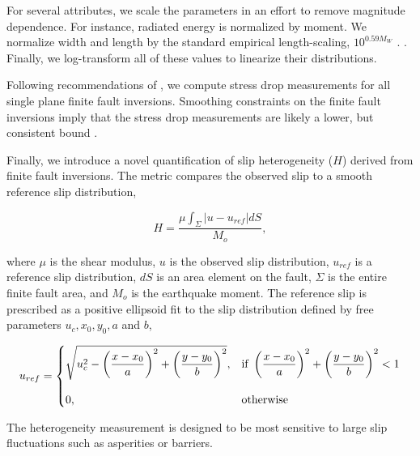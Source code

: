 \documentclass[draft, jgrga]{agujournal2018}
\begin{document}
For several attributes, we scale the parameters in an effort to remove magnitude dependence. For instance, radiated energy is normalized by moment. We normalize width and length by the standard empirical length-scaling, $10^{0.59M_W}$ \citep[][Table 2A - Subsurface rupture dimensions]{Wells1994}.  \citep[][Table 2A - Rupture area]{Wells1994}. Finally, we log-transform all of these values to linearize their distributions. 

Following recommendations of \citet{Noda2013}, we compute stress drop measurements for all single plane finite fault inversions. Smoothing constraints on the finite fault inversions imply that the stress drop measurements are likely a lower, but consistent bound \citep{Adams2017ExploringInversions}. 

Finally, we introduce a novel quantification of slip heterogeneity ($H$) derived from finite fault inversions. The metric compares the observed slip to a smooth reference slip distribution,
%
\begin{linenomath*}
\begin{equation}
    H = \dfrac{\mu \int_\Sigma |u-u_{ref}| dS}{M_o},
\end{equation}
\end{linenomath*}
%
where $\mu$ is the shear modulus, $u$ is the observed slip distribution, $u_{ref}$ is a reference slip distribution, $dS$ is an area element on the fault, $\Sigma$ is the entire finite fault area, and $M_o$ is the earthquake moment. The reference slip is prescribed as a positive ellipsoid fit to the slip distribution defined by free parameters $u_{c}, x_0, y_0, a$ and $b$,
%
\begin{linenomath*}
\begin{equation}\label{eq:heterogeneity}
u_{ref}=\left\{
\begin{array}{@{}ll@{}}
     \sqrt{u_{c}^2 - \left(\dfrac{x-x_0}{a}\right)^2 +  \left(\dfrac{y-y_0}{b}\right)^2}, & \text{if}\ \left(\dfrac{x-x_0}{a}\right)^2 +  \left(\dfrac{y-y_0}{b}\right)^2 < 1 \\
     \\
    0, & \text{otherwise}
    \end{array}\right.
\end{equation}
\end{linenomath*}
%
The heterogeneity measurement is designed to be most sensitive to large slip fluctuations such as asperities or barriers.
\end{document}
